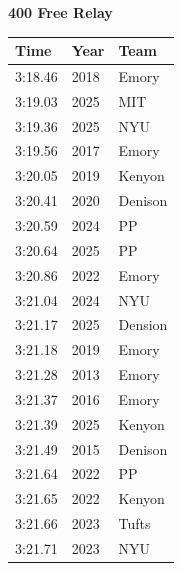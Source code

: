 \noindent\begin{minipage}[t]{0.98\textwidth}
\centering
\textbf{\textcolor{teamprimary}{400 Free Relay}}\par
\vspace{0.5em}
\centering
\small
\renewcommand{\arraystretch}{1.0}
\setlength{\tabcolsep}{4pt}
\begin{tabular}{@{}p{4.5cm}p{2.5cm}p{4.5cm}@{}}
\toprule
\textbf{Time} & \textbf{Year} & \textbf{Team} \\
\midrule
3:18.46 & 2018 & Emory \\
3:19.03 & 2025 & MIT \\
3:19.36 & 2025 & NYU \\
3:19.56 & 2017 & Emory \\
3:20.05 & 2019 & Kenyon \\
3:20.41 & 2020 & Denison \\
3:20.59 & 2024 & PP \\
3:20.64 & 2025 & PP \\
3:20.86 & 2022 & Emory \\
3:21.04 & 2024 & NYU \\
3:21.17 & 2025 & Dension \\
3:21.18 & 2019 & Emory \\
3:21.28 & 2013 & Emory \\
3:21.37 & 2016 & Emory \\
3:21.39 & 2025 & Kenyon \\
3:21.49 & 2015 & Denison \\
3:21.64 & 2022 & PP \\
3:21.65 & 2022 & Kenyon \\
3:21.66 & 2023 & Tufts \\
3:21.71 & 2023 & NYU \\
\bottomrule
\end{tabular}
\end{minipage}
\vspace{1.2em}
